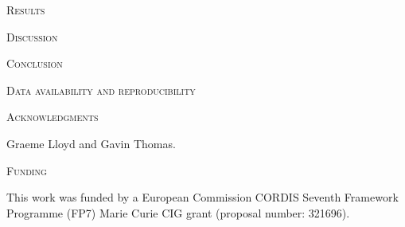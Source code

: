 \documentclass[12pt,letterpaper]{article}
\renewcommand{\section}[1]{%
\bigskip
\begin{center}
\begin{Large}
\normalfont\scshape #1
\medskip
\end{Large}
\end{center}}
\begin{document}
%
%

\section{Results}

%
%

\section{Discussion}


%
%

\section{Conclusion}



\section{Data availability and reproducibility}

\section{Acknowledgments}
Graeme Lloyd and Gavin Thomas.

\section{Funding}
This work was funded by a European Commission CORDIS Seventh Framework Programme (FP7) Marie Curie CIG grant (proposal number: 321696).
\end{document}
